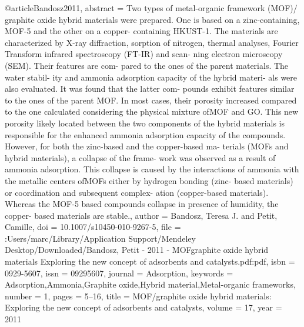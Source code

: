 @article{Bandosz2011,
abstract = {Two types of metal-organic framework (MOF)/ graphite oxide hybrid materials were prepared. One is based on a zinc-containing, MOF-5 and the other on a copper- containing HKUST-1. The materials are characterized by X-ray diffraction, sorption of nitrogen, thermal analyses, Fourier Transform infrared spectroscopy (FT-IR) and scan- ning electron microscopy (SEM). Their features are com- pared to the ones of the parent materials. The water stabil- ity and ammonia adsorption capacity of the hybrid materi- als were also evaluated. It was found that the latter com- pounds exhibit features similar to the ones of the parent MOF. In most cases, their porosity increased compared to the one calculated considering the physical mixture ofMOF and GO. This new porosity likely located between the two components of the hybrid materials is responsible for the enhanced ammonia adsorption capacity of the compounds. However, for both the zinc-based and the copper-based ma- terials (MOFs and hybrid materials), a collapse of the frame- work was observed as a result of ammonia adsorption. This collapse is caused by the interactions of ammonia with the metallic centers ofMOFs either by hydrogen bonding (zinc- based materials) or coordination and subsequent complex- ation (copper-based materials). Whereas the MOF-5 based compounds collapse in presence of humidity, the copper- based materials are stable.},
author = {Bandosz, Teresa J. and Petit, Camille},
doi = {10.1007/s10450-010-9267-5},
file = {:Users/marc/Library/Application Support/Mendeley Desktop/Downloaded/Bandosz, Petit - 2011 - MOFgraphite oxide hybrid materials Exploring the new concept of adsorbents and catalysts.pdf:pdf},
isbn = {0929-5607},
issn = {09295607},
journal = {Adsorption},
keywords = {Adsorption,Ammonia,Graphite oxide,Hybrid material,Metal-organic frameworks},
number = {1},
pages = {5--16},
title = {{MOF/graphite oxide hybrid materials: Exploring the new concept of adsorbents and catalysts}},
volume = {17},
year = {2011}
}
